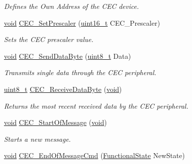 \begin{DoxyCompactItemize}
\begin{DoxyCompactList}\small\item\em Defines the Own Address of the C\+EC device. \end{DoxyCompactList}\item 
\hyperlink{usb__devapi_8h_afabf60e7f57651d6d595a02c75f07cd0}{void} \hyperlink{group___c_e_c___exported___functions_gad2fc626e28a82008a29f062975a9af11}{C\+E\+C\+\_\+\+Set\+Prescaler} (\hyperlink{_p_e___types_8h_a1f1825b69244eb3ad2c7165ddc99c956}{uint16\+\_\+t} C\+E\+C\+\_\+\+Prescaler)
\begin{DoxyCompactList}\small\item\em Sets the C\+EC prescaler value. \end{DoxyCompactList}\item 
\hyperlink{usb__devapi_8h_afabf60e7f57651d6d595a02c75f07cd0}{void} \hyperlink{group___c_e_c___exported___functions_ga6897ab26d8f909f9160e9fac54b97441}{C\+E\+C\+\_\+\+Send\+Data\+Byte} (\hyperlink{_p_e___types_8h_aba7bc1797add20fe3efdf37ced1182c5}{uint8\+\_\+t} Data)
\begin{DoxyCompactList}\small\item\em Transmits single data through the C\+EC peripheral. \end{DoxyCompactList}\item 
\hyperlink{_p_e___types_8h_aba7bc1797add20fe3efdf37ced1182c5}{uint8\+\_\+t} \hyperlink{group___c_e_c___exported___functions_ga165837bff6292e7674eff6f8b230da97}{C\+E\+C\+\_\+\+Receive\+Data\+Byte} (\hyperlink{usb__devapi_8h_afabf60e7f57651d6d595a02c75f07cd0}{void})
\begin{DoxyCompactList}\small\item\em Returns the most recent received data by the C\+EC peripheral. \end{DoxyCompactList}\item 
\hyperlink{usb__devapi_8h_afabf60e7f57651d6d595a02c75f07cd0}{void} \hyperlink{group___c_e_c___exported___functions_ga71e700461ffe7820d9e1c75da65fd0fb}{C\+E\+C\+\_\+\+Start\+Of\+Message} (\hyperlink{usb__devapi_8h_afabf60e7f57651d6d595a02c75f07cd0}{void})
\begin{DoxyCompactList}\small\item\em Starts a new message. \end{DoxyCompactList}\item 
\hyperlink{usb__devapi_8h_afabf60e7f57651d6d595a02c75f07cd0}{void} \hyperlink{group___c_e_c___exported___functions_ga1e2cf6e3a1ac891f2814f9d3f4043574}{C\+E\+C\+\_\+\+End\+Of\+Message\+Cmd} (\hyperlink{agilefox_2library_2inc_2stm32f10x__type_8h_ac9a7e9a35d2513ec15c3b537aaa4fba1}{Functional\+State} New\+State)

\end{DoxyCompactItemize}
